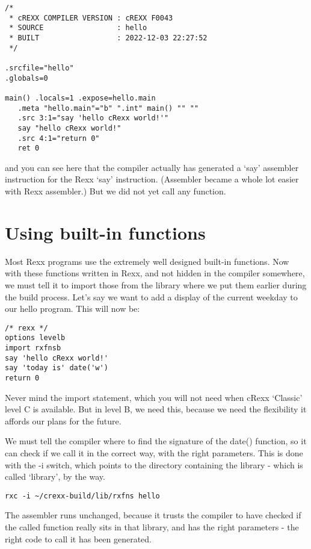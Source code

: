 \begin{verbatim}
/*
 * cREXX COMPILER VERSION : cREXX F0043
 * SOURCE                 : hello
 * BUILT                  : 2022-12-03 22:27:52
 */

.srcfile="hello"
.globals=0

main() .locals=1 .expose=hello.main
   .meta "hello.main"="b" ".int" main() "" ""
   .src 3:1="say 'hello cRexx world!'"
   say "hello cRexx world!"
   .src 4:1="return 0"
   ret 0
\end{verbatim}

and you can see here that the compiler actually has generated a `say'
assembler instruction for the Rexx `say' instruction. (Assembler became
a whole lot easier with Rexx assembler.) But we did not yet call any
function.

\hypertarget{using-built-in-functions}{%
\section{Using built-in functions}\label{using-built-in-functions}}

Most Rexx programs use the extremely well designed built-in functions.
Now with these functions written in Rexx, and not hidden in the compiler
somewhere, we must tell it to import those from the library where we put
them earlier during the build process. Let's say we want to add a
display of the current weekday to our hello program. This will now be:

\begin{verbatim}
/* rexx */
options levelb
import rxfnsb
say 'hello cRexx world!'
say 'today is' date('w')
return 0
\end{verbatim}

Never mind the import statement, which you will not need when cRexx
`Classic' level C is available. But in level B, we need this, because we
need the flexibility it affords our plans for the future.

We must tell the compiler where to find the signature of the date()
function, so it can check if we call it in the correct way, with the
right parameters. This is done with the -i switch, which points to the
directory containing the library - which is called `library', by the
way.

\begin{verbatim}
rxc -i ~/crexx-build/lib/rxfns hello
\end{verbatim}

The assembler runs unchanged, because it trusts the compiler to have
checked if the called function really sits in that library, and has the
right parameters - the right code to call it has been generated.

